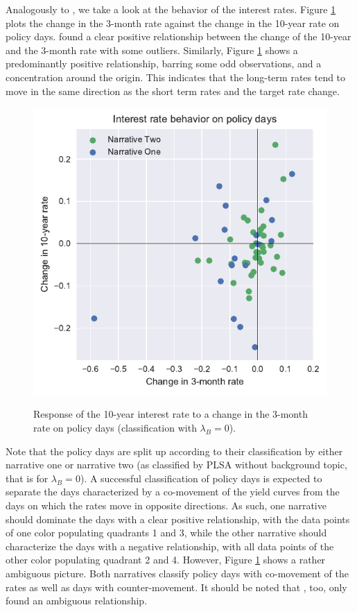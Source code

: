 \documentclass[11pt,a4paper,english,oneside]{book}
\numberwithin{equation}{chapter}
\begin{document}
Analogously to \citet[pp. 14--15]{Ellingsen.2003}, we take a look at the behavior of the interest rates. Figure \ref{Change01} plots the change in the 3-month rate against the change in the 10-year rate on policy days. \citet[p. 14]{Ellingsen.2003} found a clear positive relationship between the change of the 10-year and the 3-month rate with some outliers. Similarly, Figure \ref{Change01} shows a predominantly positive relationship, barring some odd observations, and a concentration around the origin. This indicates that the long-term rates tend to move in the same direction as the short term rates and the target rate change. 

\begin{figure}
	\caption{Response of the 10-year interest rate to a change in the 3-month rate on policy days (classification with $\lambda_B=0$).}
	\centering
	\includegraphics[scale=1]{Images/ChangePlot_L0_0.pdf}
	\label{Change01}
\end{figure}

Note that the policy days are split up according to their classification by either narrative one or narrative two (as classified by PLSA without background topic, that is for $\lambda_B=0$). A successful classification of policy days is expected to separate the days characterized by a co-movement of the yield curves from the days on which the rates move in opposite directions. As such, one narrative should dominate the days with a clear positive relationship, with the data points of one color populating quadrants 1 and 3, while the other narrative should characterize the days with a negative relationship, with all data points of the other color populating quadrant 2 and 4. However, Figure \ref{Change01} shows a rather ambiguous picture. Both narratives classify policy days with co-movement of the rates as well as days with counter-movement.  It should be noted that \citet[pp. 14--15]{Ellingsen.2003}, too, only found an ambiguous relationship.
\end{document}
